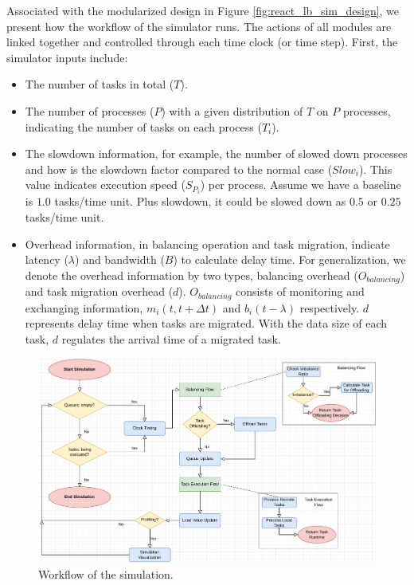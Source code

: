 Associated with the modularized design in Figure \ref{fig:react_lb_sim_design}, we present how the workflow of the simulator runs. The actions of all modules are linked together and controlled through each time clock (or time step). First, the simulator inputs include:
\begin{itemize}
	\item The number of tasks in total ($T$).
	\item The number of processes ($P$) with a given distribution of $T$ on $P$ processes, indicating the number of tasks on each process ($T_{i}$).
	\item The slowdown information, for example, the number of slowed down processes and how is the slowdown factor compared to the normal case ($Slow_{i}$). This value indicates execution speed ($S_{P_{i}}$) per process. Assume we have a baseline is $1.0$ tasks/time unit. Plus slowdown, it could be slowed down as $0.5$ or $0.25$ tasks/time unit.
	\item Overhead information, in balancing operation and task migration, indicate latency ($\lambda$) and bandwidth ($B$) to calculate delay time. For generalization, we denote the overhead information by two types, balancing overhead ($O_{balancing}$) and task migration overhead ($d$). $O_{balancing}$ consists of monitoring and exchanging information, $m_{i}(t, t+\Delta t)$ and $b_{i}(t - \lambda)$ respectively. $d$ represents delay time when tasks are migrated. With the data size of each task, $d$ regulates the arrival time of a migrated task.
\end{itemize}

\begin{figure}[t]
  \centering
  \includegraphics[scale=0.55]{./pictures/perf_analysis_model/perf_simulation_flow.pdf}
	\caption{Workflow of the simulation.}
	\label{fig:react_lb_simulator_flow}
\end{figure}

